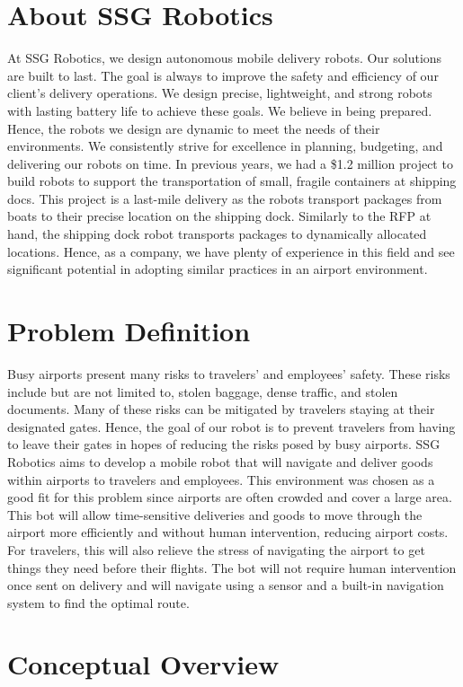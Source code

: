\documentclass[letterpaper,fleqn,oneside]{template}
\begin{document}
\section{About SSG Robotics}
At SSG Robotics, we design autonomous mobile delivery robots. Our solutions are built to last. The goal is always to improve the safety and efficiency of our client’s delivery operations. We design precise, lightweight, and strong robots with lasting battery life to achieve these goals. We believe in being prepared. Hence, the robots we design are dynamic to meet the needs of their environments. We consistently strive for excellence in planning, budgeting, and delivering our robots on time. In previous years, we had a \$1.2 million project to build robots to support the transportation of small, fragile containers at shipping docs. This project is a last-mile delivery as the robots transport packages from boats to their precise location on the shipping dock. Similarly to the RFP at hand, the shipping dock robot transports packages to dynamically allocated locations. Hence, as a company, we have plenty of experience in this field and see significant potential in adopting similar practices in an airport environment.


\section{Problem Definition}
Busy airports present many risks to travelers' and employees' safety. These risks include but are not limited to, stolen baggage, dense traffic, and stolen documents. Many of these risks can be mitigated by travelers staying at their designated gates. Hence, the goal of our robot is to prevent travelers from having to leave their gates in hopes of reducing the risks posed by busy airports. SSG Robotics aims to develop a mobile robot that will navigate and deliver goods within airports to travelers and employees. This environment was chosen as a good fit for this problem since airports are often crowded and cover a large area. This bot will allow time-sensitive deliveries and goods to move through the airport more efficiently and without human intervention, reducing airport costs. For travelers, this will also relieve the stress of navigating the airport to get things they need before their flights. The bot will not require human intervention once sent on delivery and will navigate using a sensor and a built-in navigation system to find the optimal route.

\section{Conceptual Overview}
\end{document}
